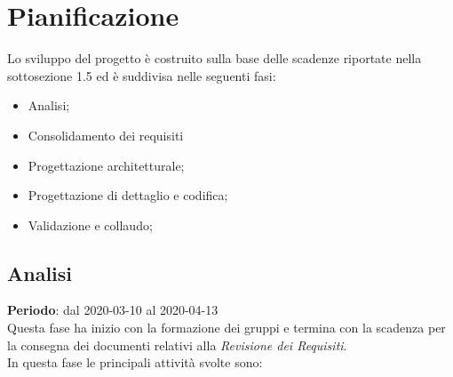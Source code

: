 \section{Pianificazione}
Lo sviluppo del progetto è costruito sulla base delle scadenze riportate nella sottosezione 1.5 ed è suddivisa nelle seguenti fasi:
\begin{itemize}
	\item Analisi;
	\item Consolidamento dei requisiti
	\item Progettazione architetturale;
	\item Progettazione di dettaglio e codifica;
	\item Validazione e collaudo;
\end{itemize}

\subsection{Analisi}
\textbf{Periodo}: dal 2020-03-10 al 2020-04-13 \\
Questa fase ha inizio con la formazione dei gruppi e termina con la scadenza per la consegna dei documenti relativi alla \textit{Revisione dei Requisiti}. \\
In questa fase le principali attività svolte sono:
